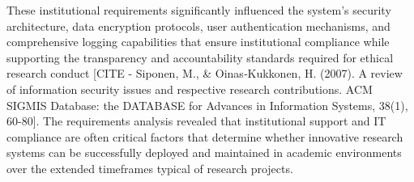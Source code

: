 \documentclass[12pt,a4paper]{article}
\begin{document}
These institutional requirements significantly influenced the system's security architecture, data encryption protocols,
user authentication mechanisms, and comprehensive logging capabilities that ensure institutional compliance while
supporting the transparency and accountability standards required for ethical research
conduct [CITE - Siponen, M., \& Oinas‐Kukkonen, H. (2007). A review of information security issues and respective research contributions. ACM SIGMIS Database: the DATABASE for Advances in Information Systems, 38(1), 60-80].
The requirements analysis revealed that institutional support and IT compliance are often critical factors that
determine whether innovative research systems can be successfully deployed and maintained in academic environments over
the extended timeframes typical of research projects.
\end{document}
